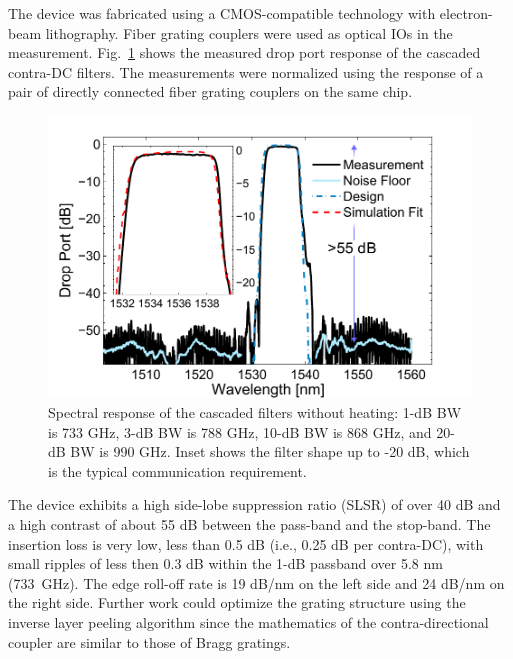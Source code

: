 \documentclass[9pt,twocolumn,twoside]{osajnl}
\begin{document}

The device was fabricated using a CMOS-compatible technology with electron-beam lithography. 
Fiber grating couplers\cite{zhong2014focusingFGC} were used as optical IOs in the measurement. 
Fig.~\ref{fig:passive} shows the measured drop port response of the cascaded contra-DC filters. 
The measurements were normalized using the response of a pair of directly connected fiber grating couplers on the same chip.
\begin{figure}[htbp]
\centering
\includegraphics[width=.99\columnwidth]{data/Passive62}
\caption{ Spectral response of the cascaded filters without heating: 1-dB BW is 733 GHz, 3-dB BW is 788 GHz, 10-dB BW is 868 GHz, and 20-dB BW is 990 GHz. Inset shows the filter shape up to -20 dB, which is the typical communication requirement.}
\label{fig:passive}
\end{figure}

The device exhibits a high side-lobe suppression ratio (SLSR) of over 40 dB and a high contrast of about 55 dB between the pass-band and the stop-band. 
The insertion loss is very low, less than 0.5 dB (i.e., 0.25 dB per contra-DC), with small ripples of less then 0.3 dB within the 1-dB passband over 5.8 nm (733~GHz). 
The edge roll-off rate is 19 dB/nm on the left side and 24 dB/nm on the right side.
Further work could optimize the grating structure using the inverse layer peeling algorithm\cite{skaar2001synthesis} since the mathematics of the contra-directional coupler are similar to those of Bragg gratings.
\end{document}
